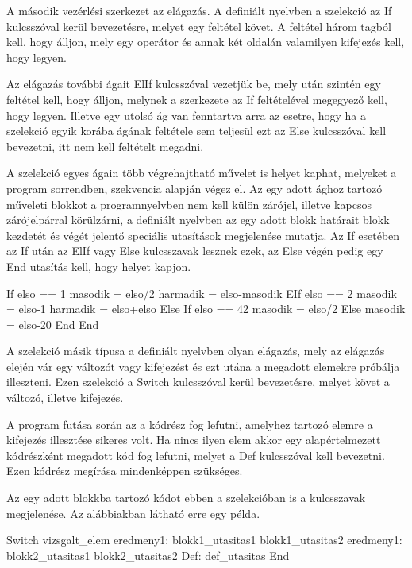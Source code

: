 A második vezérlési szerkezet az elágazás. A definiált nyelvben a szelekció az If kulcsszóval kerül bevezetésre, melyet egy feltétel követ. A feltétel három tagból kell, hogy álljon, mely egy operátor és annak két oldalán valamilyen kifejezés kell, hogy legyen.

Az elágazás további ágait ElIf kulcsszóval vezetjük be, mely után szintén egy feltétel kell, hogy álljon, melynek a szerkezete az If feltételével megegyező kell, hogy legyen. Illetve egy utolsó ág van fenntartva arra az esetre, hogy ha a szelekció egyik korába ágának feltétele sem teljesül ezt az Else kulcsszóval kell bevezetni, itt nem kell feltételt megadni.

A szelekció egyes ágain több végrehajtható művelet is helyet kaphat, melyeket a program sorrendben, szekvencia alapján végez el. Az egy adott ághoz tartozó műveleti blokkot a programnyelvben nem kell külön zárójel, illetve kapcsos zárójelpárral körülzárni, a definiált nyelvben az egy adott blokk határait blokk kezdetét és végét jelentő speciális utasítások megjelenése mutatja. Az If esetében az If után az ElIf vagy Else kulcsszavak lesznek ezek, az Else végén pedig egy End utasítás kell, hogy helyet kapjon.

\begin{cpp}
If elso == 1
	masodik = elso/2
	harmadik = elso-masodik
EIf elso == 2
	masodik = elso-1
	harmadik =  elso+elso
Else
	If elso == 42
		masodik = elso/2
	Else
		masodik = elso-20
	End
End
\end{cpp}

A szelekció másik típusa a definiált nyelvben olyan elágazás, mely az elágazás elején vár egy változót vagy kifejezést és ezt utána a megadott elemekre próbálja illeszteni. Ezen szelekció a Switch kulcsszóval kerül bevezetésre, melyet követ a változó, illetve kifejezés.

A program futása során az a kódrész fog lefutni, amelyhez tartozó elemre a kifejezés illesztése sikeres volt. Ha nincs ilyen elem akkor egy alapértelmezett kódrészként megadott kód fog lefutni, melyet a Def kulcsszóval kell bevezetni. Ezen kódrész megírása mindenképpen szükséges.

Az egy adott blokkba tartozó kódot ebben a szelekcióban is a kulcsszavak megjelenése. Az alábbiakban látható erre egy példa.

\begin{cpp}
Switch vizsgalt_elem
	eredmeny1:
		blokk1_utasitas1
		blokk1_utasitas2
	eredmeny1:
		blokk2_utasitas1
		blokk2_utasitas2
	Def:
		def_utasitas
End
\end{cpp}


